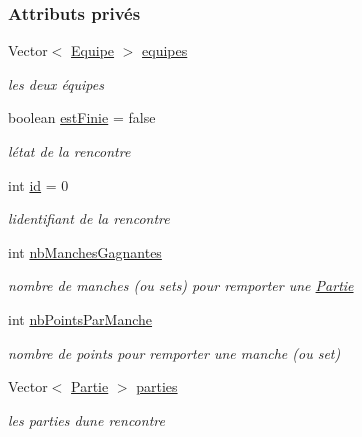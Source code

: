 \subsubsection*{Attributs privés}
\begin{DoxyCompactItemize}
\item 
Vector$<$ \hyperlink{classcom_1_1example_1_1area_1_1_equipe}{Equipe} $>$ \hyperlink{classcom_1_1example_1_1area_1_1_rencontre_accbafe5a878f457fb7119cfd55401c86}{equipes}
\begin{DoxyCompactList}\small\item\em les deux équipes \end{DoxyCompactList}\item 
boolean \hyperlink{classcom_1_1example_1_1area_1_1_rencontre_a2124164efb96db89312021ed57d795c1}{est\+Finie} = false
\begin{DoxyCompactList}\small\item\em l\textquotesingle{}état de la rencontre \end{DoxyCompactList}\item 
int \hyperlink{classcom_1_1example_1_1area_1_1_rencontre_a570f0dcf549626a6a87ab9e994279fde}{id} = 0
\begin{DoxyCompactList}\small\item\em l\textquotesingle{}identifiant de la rencontre \end{DoxyCompactList}\item 
int \hyperlink{classcom_1_1example_1_1area_1_1_rencontre_aef266bd256aecd70fbd02cf07625ed14}{nb\+Manches\+Gagnantes}
\begin{DoxyCompactList}\small\item\em nombre de manches (ou sets) pour remporter une \hyperlink{classcom_1_1example_1_1area_1_1_partie}{Partie} \end{DoxyCompactList}\item 
int \hyperlink{classcom_1_1example_1_1area_1_1_rencontre_ae1849c4bcdcfbb2d336b750a36be1162}{nb\+Points\+Par\+Manche}
\begin{DoxyCompactList}\small\item\em nombre de points pour remporter une manche (ou set) \end{DoxyCompactList}\item 
Vector$<$ \hyperlink{classcom_1_1example_1_1area_1_1_partie}{Partie} $>$ \hyperlink{classcom_1_1example_1_1area_1_1_rencontre_a9bdc6df389184fc2ecb4d87a7879213a}{parties}
\begin{DoxyCompactList}\small\item\em les parties d\textquotesingle{}une rencontre \end{DoxyCompactList}\end{DoxyCompactItemize}


